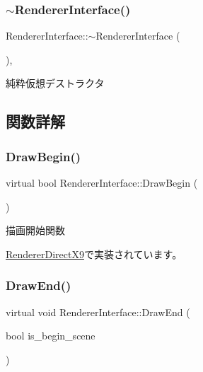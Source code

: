 \subsubsection{\texorpdfstring{$\sim$\+Renderer\+Interface()}{~RendererInterface()}}
{\footnotesize\ttfamily Renderer\+Interface\+::$\sim$\+Renderer\+Interface (\begin{DoxyParamCaption}{ }\end{DoxyParamCaption})\hspace{0.3cm}{\ttfamily [inline]}, {}}



純粋仮想デストラクタ 



\subsection{関数詳解}
\mbox{\label{class_renderer_interface_a86a487deb4e4207a67410d00ec670fd7}} 
\subsubsection{\texorpdfstring{Draw\+Begin()}{DrawBegin()}}
{\footnotesize\ttfamily virtual bool Renderer\+Interface\+::\+Draw\+Begin (\begin{DoxyParamCaption}{ }\end{DoxyParamCaption})\hspace{0.3cm}{\ttfamily [pure virtual]}}



描画開始関数 



\mbox{\hyperlink{class_renderer_direct_x9_a61fc7dc142c3d54f83152fc3bb259ff4}{Renderer\+Direct\+X9}}で実装されています。

\mbox{\label{class_renderer_interface_a0034a44420e4746062e70e4d66d3bee2}} 
\subsubsection{\texorpdfstring{Draw\+End()}{DrawEnd()}}
{\footnotesize\ttfamily virtual void Renderer\+Interface\+::\+Draw\+End (\begin{DoxyParamCaption}\item[{bool}]{is\+\_\+begin\+\_\+scene }\end{DoxyParamCaption})\hspace{0.3cm}{\ttfamily [pure virtual]}}



